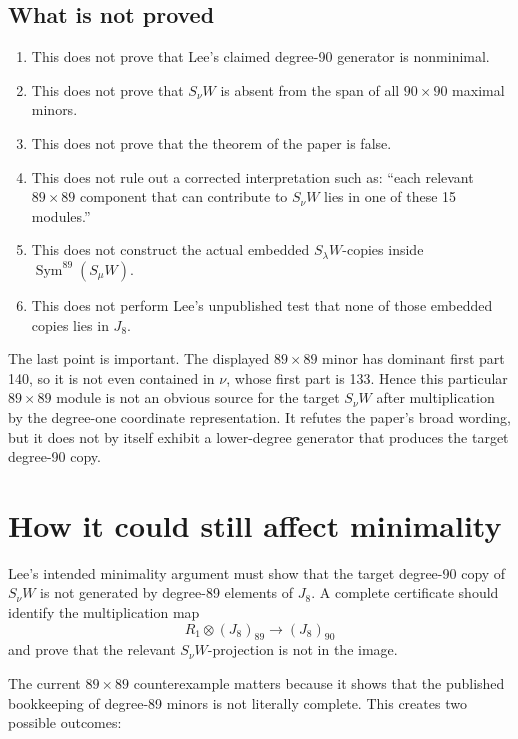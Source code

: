\documentclass[11pt]{article}
\newcommand{\Sym}{\operatorname{Sym}}
\begin{document}
\subsection{What is not proved}

\begin{enumerate}
  \item This does not prove that Lee's claimed degree-90 generator is
  nonminimal.
  \item This does not prove that \(S_\nu W\) is absent from the span of all
  \(90\times90\) maximal minors.
  \item This does not prove that the theorem of the paper is false.
  \item This does not rule out a corrected interpretation such as: ``each
  relevant \(89\times89\) component that can contribute to \(S_\nu W\) lies in
  one of these 15 modules.''
  \item This does not construct the actual embedded \(S_\lambda W\)-copies
  inside \(\Sym^{89}(S_\mu W)\).
  \item This does not perform Lee's unpublished test that none of those
  embedded copies lies in \(J_8\).
\end{enumerate}

The last point is important.  The displayed \(89\times89\) minor has dominant
first part 140, so it is not even contained in \(\nu\), whose first part is
133.  Hence this particular \(89\times89\) module is not an obvious source for
the target \(S_\nu W\) after multiplication by the degree-one coordinate
representation.  It refutes the paper's broad wording, but it does not by
itself exhibit a lower-degree generator that produces the target degree-90
copy.

\section{How it could still affect minimality}

Lee's intended minimality argument must show that the target degree-90 copy of
\(S_\nu W\) is not generated by degree-89 elements of \(J_8\).  A complete
certificate should identify the multiplication map
\[
 R_1\otimes (J_8)_{89}\longrightarrow (J_8)_{90}
\]
and prove that the relevant \(S_\nu W\)-projection is not in the image.

The current \(89\times89\) counterexample matters because it shows that the
published bookkeeping of degree-89 minors is not literally complete.  This
creates two possible outcomes:
\end{document}
